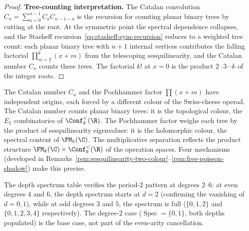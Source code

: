 \begin{proof}
\smallskip
\noindent\textbf{Tree-counting interpretation.}
The Catalan convolution
$C_n = \sum_{a=0}^{n-1}C_a C_{n-1-a}$ is the recursion for
counting planar binary trees by cutting at the root.
At the symmetric point the spectral dependence collapses,
and the Stasheff recursion~\eqref{eq:stasheff-sym-recursion}
reduces to a weighted tree count: each planar binary tree with
$n{+}1$ internal vertices contributes the falling factorial
$\prod_{m=2}^{k}(x{+}m)$ from the telescoping sesquilinearity,
and the Catalan number $C_n$ counts these trees. The
factorial $k!$ at $x = 0$ is the product $2 \cdot 3 \cdots k$
of the integer roots.
\end{proof}

The Catalan number $C_n$ and the Pochhammer factor $\prod(x+m)$
have independent origins, each forced by a
different colour of the Swiss-cheese operad. The Catalan number
counts planar binary trees: it is the topological colour, the
$E_1$ combinatorics of $\Conf_k^<(\R)$. The Pochhammer factor
weighs each tree by the product of sesquilinearity eigenvalues:
it is the holomorphic colour, the spectral content of
$\FM_k(\C)$. The multiplicative separation reflects the
product structure $\FM_k(\C) \times \Conf_k^<(\R)$ of the
operation spaces. Four mechanisms (developed in
Remarks~\ref{rem:sesquilinearity-two-colour}--\ref{rem:free-poisson-shadow})
make this precise.

\begin{remark}
\label{rem:period-2-verification}%
The depth spectrum table verifies the period-$2$ pattern
at degrees $2$--$6$: at even degrees $4$ and $6$, the depth
spectrum starts at $d = 2$ (confirming the vanishing of
$d = 0, 1$), while at odd degrees $3$ and $5$, the spectrum is
full ($\{0, 1, 2\}$ and $\{0, 1, 2, 3, 4\}$ respectively).
The degree-$2$ case ($\operatorname{Spec} = \{0, 1\}$, both
depths populated) is the base case, not part of the even-arity
cancellation.
\end{remark}

